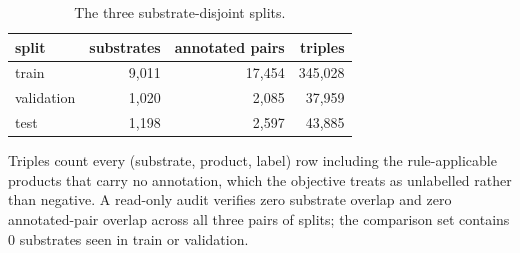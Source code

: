 \begin{table}[h]
\centering\small
\begin{threeparttable}
\caption{The three substrate-disjoint splits.}
\label{tab:si-splits}
\begin{tabular}{lrrr}
\toprule
split & substrates & annotated pairs & triples \\
\midrule
train & 9{,}011 & 17{,}454 & 345{,}028 \\
validation & 1{,}020 & 2{,}085 & 37{,}959 \\
test & 1{,}198 & 2{,}597 & 43{,}885 \\
\bottomrule
\end{tabular}
\begin{tablenotes}[flushleft]\footnotesize
\item Triples count every (substrate, product, label) row including the rule-applicable products that carry no annotation, which the objective treats as unlabelled rather than negative. A read-only audit verifies zero substrate overlap and zero annotated-pair overlap across all three pairs of splits; the comparison set contains 0 substrates seen in train or validation.
\end{tablenotes}
\end{threeparttable}
\end{table}
